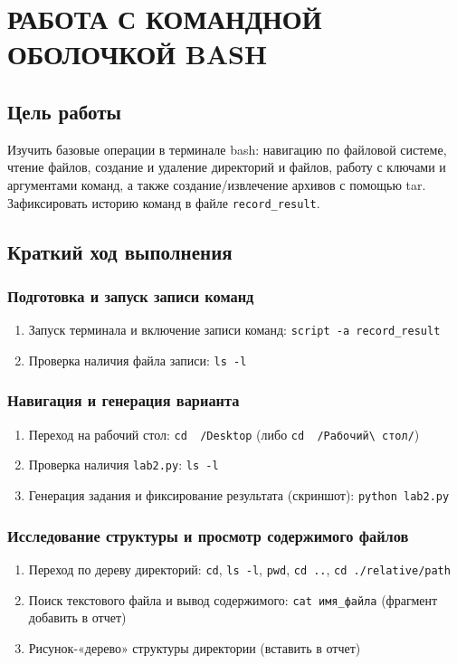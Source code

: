 \chapter{РАБОТА С КОМАНДНОЙ ОБОЛОЧКОЙ BASH}

\section{Цель работы}
Изучить базовые операции в терминале bash: навигацию по файловой системе, чтение файлов, создание и удаление директорий и файлов, работу с ключами и аргументами команд, а также создание/извлечение архивов с помощью tar. Зафиксировать историю команд в файле \texttt{record\_result}.

\section{Краткий ход выполнения}

\subsection{Подготовка и запуск записи команд}
\begin{enumerate}
  \item Запуск терминала и включение записи команд: \texttt{script -a record\_result}
  \item Проверка наличия файла записи: \texttt{ls -l}
\end{enumerate}

\subsection{Навигация и генерация варианта}
\begin{enumerate}
  \item Переход на рабочий стол: \texttt{cd ~/Desktop} (либо \texttt{cd ~/Рабочий\textbackslash{} стол/})
  \item Проверка наличия \texttt{lab2.py}: \texttt{ls -l}
  \item Генерация задания и фиксирование результата (скриншот): \texttt{python lab2.py}
\end{enumerate}

\subsection{Исследование структуры и просмотр содержимого файлов}
\begin{enumerate}
  \item Переход по дереву директорий: \texttt{cd}, \texttt{ls -l}, \texttt{pwd}, \texttt{cd ..}, \texttt{cd ./relative/path}
  \item Поиск текстового файла и вывод содержимого: \texttt{cat имя\_файла} (фрагмент добавить в отчет)
  \item Рисунок-«дерево» структуры директории (вставить в отчет)
\end{enumerate}

